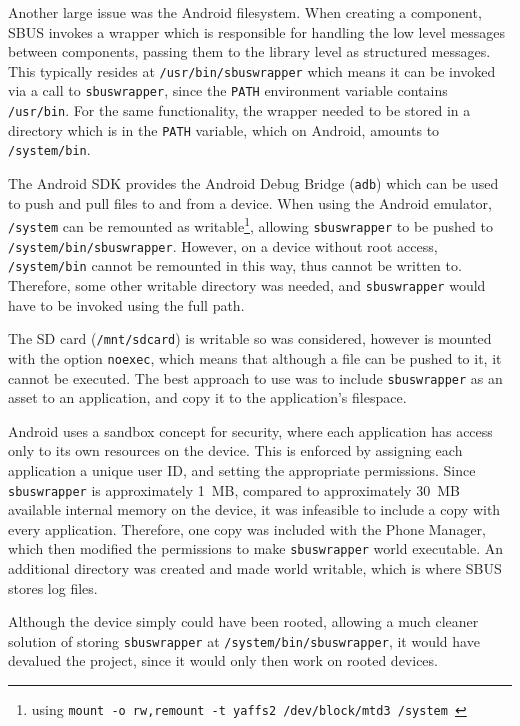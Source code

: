 \documentclass[12pt,twoside,notitlepage]{report}
\begin{document}
Another large issue was the Android filesystem. 
When creating a component, SBUS invokes a wrapper which is responsible for handling the low level messages between components, passing them to the library level as structured messages.
This typically resides at {\tt /usr/bin/sbuswrapper} which means it can be invoked via a call to {\tt sbuswrapper}, since the {\tt PATH} environment variable contains {\tt /usr/bin}. 
For the same functionality, the wrapper needed to be stored in a directory which is in the {\tt PATH} variable, which on Android, amounts to {\tt /system/bin}. 

The Android SDK provides the Android Debug Bridge ({\tt adb}) which can be used to push and pull files to and from a device. 
When using the Android emulator, {\tt /system} can be remounted as writable\footnote{using {\tt mount -o rw,remount -t yaffs2 /dev/block/mtd3 /system }}, allowing {\tt sbuswrapper} to be pushed to {\tt /system/bin/sbuswrapper}. 
However, on a device without root access, {\tt /system/bin} cannot be remounted in this way, thus cannot be written to. 
Therefore, some other writable directory was needed, and {\tt sbuswrapper} would have to be invoked using the full path. 

The SD card ({\tt /mnt/sdcard}) is writable so was considered, however is mounted with the option {\tt noexec}, which means that although a file can be pushed to it, it cannot be executed. 
The best approach to use was to include {\tt sbuswrapper} as an asset to an application, and copy it to the application's filespace.

Android uses a sandbox concept for security, where each application has access only to its own resources on the device. 
This is enforced by assigning each application a unique user ID, and setting the appropriate permissions. 
Since {\tt sbuswrapper} is approximately \SI{1}{MB}, compared to approximately \SI{30}{MB} available internal memory on the device, it was infeasible to include a copy with every application. 
Therefore, one copy was included with the Phone Manager, which then modified the permissions to make {\tt sbuswrapper} world executable. 
An additional directory was created and made world writable, which is where SBUS stores log files. 

Although the device simply could have been rooted, allowing a much cleaner solution of storing {\tt sbuswrapper} at {\tt /system/bin/sbuswrapper}, it would have devalued the project, since it would only then work on rooted devices.
\end{document}
